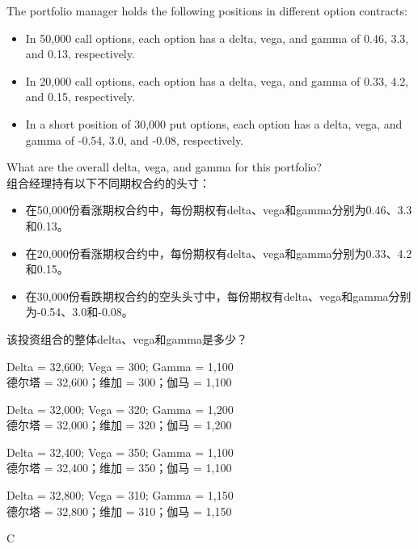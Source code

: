 \documentclass{article}
\newcounter{question} %
\begin{document}
\begin{question}
    The portfolio manager holds the following positions in different option contracts:
    \begin{itemize}
        \item In 50,000 call options, each option has a delta, vega, and gamma of 0.46, 3.3, and 0.13, respectively.
        \item In 20,000 call options, each option has a delta, vega, and gamma of 0.33, 4.2, and 0.15, respectively.
        \item In a short position of 30,000 put options, each option has a delta, vega, and gamma of -0.54, 3.0, and -0.08, respectively.
    \end{itemize}
    What are the overall delta, vega, and gamma for this portfolio?
    \\组合经理持有以下不同期权合约的头寸：
    \begin{itemize}
        \item 在50,000份看涨期权合约中，每份期权有delta、vega和gamma分别为0.46、3.3和0.13。
        \item 在20,000份看涨期权合约中，每份期权有delta、vega和gamma分别为0.33、4.2和0.15。
        \item 在30,000份看跌期权合约的空头头寸中，每份期权有delta、vega和gamma分别为-0.54、3.0和-0.08。
    \end{itemize}
    该投资组合的整体delta、vega和gamma是多少？
\end{question}

\begin{choices}
    \item Delta = 32,600; Vega = 300; Gamma = 1,100\\
    德尔塔 = 32,600；维加 = 300；伽马 = 1,100
    \item Delta = 32,000; Vega = 320; Gamma = 1,200\\
    德尔塔 = 32,000；维加 = 320；伽马 = 1,200
    \item Delta = 32,400; Vega = 350; Gamma = 1,100\\
    德尔塔 = 32,400；维加 = 350；伽马 = 1,100
    \item Delta = 32,800; Vega = 310; Gamma = 1,150\\
    德尔塔 = 32,800；维加 = 310；伽马 = 1,150
\end{choices}

\begin{correctanswer}
    C
\end{correctanswer}
\end{document}
